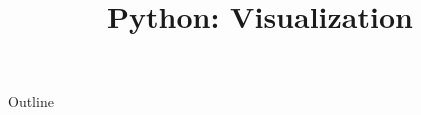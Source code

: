 \documentclass[xcolor=dvipsnames,compress,t,pdf]{beamer}
\title[\insertframenumber /\inserttotalframenumber]{Python: Visualization}
\begin{document}
	\begin{frame}
	\titlepage
	\end{frame}

	\begin{frame}{Outline}
	    \tableofcontents
	\end{frame}

	
	
	
\end{document}
